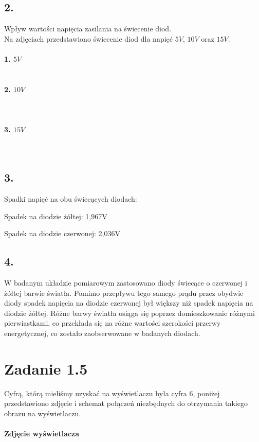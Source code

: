 \documentclass[polish,a4paper]{article}
\begin{document}
\newpage

\subsection*{2.}
Wpływ wartości napięcia zasilania na świecenie diod.\\
Na zdjęciach przedstawiono świecenie diod dla napięć $5V$, $10V$ oraz $15V$.\\
\\
\textbf{1. $5V$}\\
\\
\\
\newpage
\textbf{2. $10V$}\\
\\
\\
\\
\textbf{3. $15V$}\\
\\
\\




\subsection*{3.} Spadki napięć na obu świecących diodach:

Spadek na diodzie żółtej: 1,967V
\newline

Spadek na diodzie czerwonej: 2,036V
\newline


\subsection*{4.}
W badanym układzie pomiarowym zastosowano diody świecące o czerwonej i żółtej barwie światła. Pomimo przepływu tego samego prądu przez obydwie diody spadek napięcia na diodzie czerwonej był większy niż spadek napięcia na diodzie żółtej. Różne barwy światła osiąga się poprzez domieszkowanie różnymi pierwiastkami, co przekłada się na różne wartości szerokości przerwy energetycznej, co zostało zaobserwowane w badanych diodach.

\section{Zadanie 1.5}
Cyfrą, którą mieliśmy uzyskać na wyświetlaczu była cyfra 6, poniżej przedstawiono zdjęcie i schemat połączeń niezbędnych do otrzymania takiego obrazu na wyświetlaczu.\\
\\
\textbf{Zdjęcie wyświetlacza}\\
\end{document}
